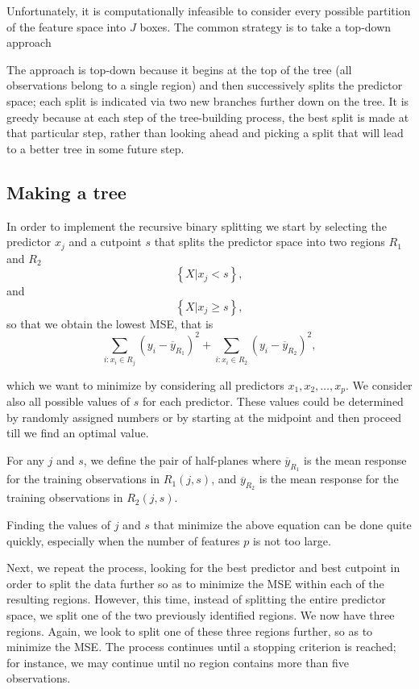 \documentclass[%
oneside,                 %
final,                   %
10pt]{article}
\begin{document}
Unfortunately, it is computationally infeasible to consider every
possible partition of the feature space into $J$ boxes.  The common
strategy is to take a top-down approach

The approach is top-down because it begins at the top of the tree (all
observations belong to a single region) and then successively splits
the predictor space; each split is indicated via two new branches
further down on the tree. It is greedy because at each step of the
tree-building process, the best split is made at that particular step,
rather than looking ahead and picking a split that will lead to a
better tree in some future step.

\subsection*{Making a tree}

In order to implement the recursive binary splitting we start by selecting
the predictor $x_j$ and a cutpoint $s$ that splits the predictor space into two regions $R_1$ and $R_2$
\[
\left\{X\vert x_j < s\right\},
\]
and
\[
\left\{X\vert x_j \geq s\right\},
\]
so that we obtain the lowest MSE, that is
\[
\sum_{i:x_i\in R_j}(y_i-\overline{y}_{R_1})^2+\sum_{i:x_i\in R_2}(y_i-\overline{y}_{R_2})^2,
\]

which we want to minimize by considering all predictors
$x_1,x_2,\dots,x_p$.  We consider also all possible values of $s$ for
each predictor. These values could be determined by randomly assigned
numbers or by starting at the midpoint and then proceed till we find
an optimal value.

For any $j$ and $s$, we define the pair of half-planes where
$\overline{y}_{R_1}$ is the mean response for the training
observations in $R_1(j,s)$, and $\overline{y}_{R_2}$ is the mean
response for the training observations in $R_2(j,s)$.

Finding the values of $j$ and $s$ that minimize the above equation can be
done quite quickly, especially when the number of features $p$ is not
too large.

Next, we repeat the process, looking
for the best predictor and best cutpoint in order to split the data
further so as to minimize the MSE within each of the resulting
regions. However, this time, instead of splitting the entire predictor
space, we split one of the two previously identified regions. We now
have three regions. Again, we look to split one of these three regions
further, so as to minimize the MSE. The process continues until a
stopping criterion is reached; for instance, we may continue until no
region contains more than five observations.
\end{document}
